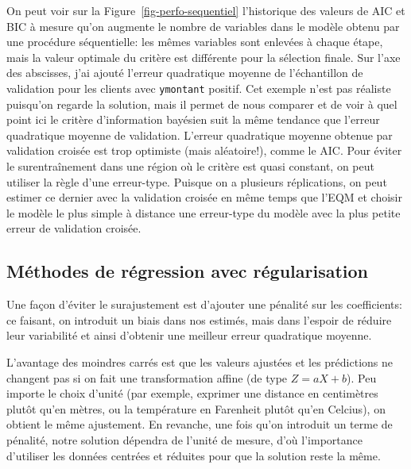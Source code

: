 \documentclass[
  11pt,
  letterpaper,
]{scrbook}
\theoremstyle{definition}
\theoremstyle{remark}
\begin{document}
On peut voir sur la Figure~\ref{fig-perfo-sequentiel} l'historique des
valeurs de AIC et BIC à mesure qu'on augmente le nombre de variables
dans le modèle obtenu par une procédure séquentielle: les mêmes
variables sont enlevées à chaque étape, mais la valeur optimale du
critère est différente pour la sélection finale. Sur l'axe des
abscisses, j'ai ajouté l'erreur quadratique moyenne de l'échantillon de
validation pour les clients avec \texttt{ymontant} positif. Cet exemple
n'est pas réaliste puisqu'on regarde la solution, mais il permet de nous
comparer et de voir à quel point ici le critère d'information bayésien
suit la même tendance que l'erreur quadratique moyenne de validation.
L'erreur quadratique moyenne obtenue par validation croisée est trop
optimiste (mais aléatoire!), comme le AIC. Pour éviter le
surentraînement dans une région où le critère est quasi constant, on
peut utiliser la règle d'une erreur-type. Puisque on a plusieurs
réplications, on peut estimer ce dernier avec la validation croisée en
même temps que l'EQM et choisir le modèle le plus simple à distance une
erreur-type du modèle avec la plus petite erreur de validation croisée.

\hypertarget{muxe9thodes-de-ruxe9gression-avec-ruxe9gularisation}{%
\subsection{Méthodes de régression avec
régularisation}\label{muxe9thodes-de-ruxe9gression-avec-ruxe9gularisation}}

Une façon d'éviter le surajustement est d'ajouter une pénalité sur les
coefficients: ce faisant, on introduit un biais dans nos estimés, mais
dans l'espoir de réduire leur variabilité et ainsi d'obtenir une
meilleur erreur quadratique moyenne.

L'avantage des moindres carrés est que les valeurs ajustées et les
prédictions ne changent pas si on fait une transformation affine (de
type \(Z = aX+b\)). Peu importe le choix d'unité (par exemple, exprimer
une distance en centimètres plutôt qu'en mètres, ou la température en
Farenheit plutôt qu'en Celcius), on obtient le même ajustement. En
revanche, une fois qu'on introduit un terme de pénalité, notre solution
dépendra de l'unité de mesure, d'où l'importance d'utiliser les données
centrées et réduites pour que la solution reste la même.
\end{document}

